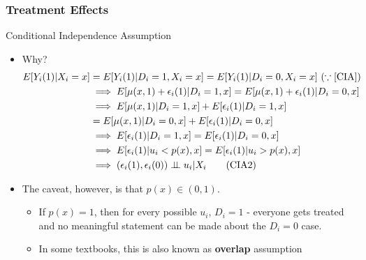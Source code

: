 \documentclass{beamer}
\begin{document}
\begin{frame}
\frametitle{Treatment Effects}
Conditional Independence Assumption
\begin{itemize}
\item Why?
\footnotesize{\begin{align*}
E[Y_i(1)|X_i=x]&=E[Y_i(1)|D_i=1,X_i=x]=E[Y_i(1)|D_i=0,X_i=x] \ (\because \ref{CIA})\\
&\implies E[\mu(x,1)+\epsilon_i(1)|D_i=1,x]=E[\mu(x,1)+\epsilon_i(1)|D_i=0,x]\\
&\implies E[\mu(x,1)|D_i=1,x]+E[\epsilon_i(1)|D_i=1,x]\\
&=E[\mu(x,1)|D_i=0,x]+E[\epsilon_i(1)|D_i=0,x]\\
&\implies E[\epsilon_i(1)|D_i=1,x]=E[\epsilon_i(1)|D_i=0,x]\\
&\implies E[\epsilon_i(1)|u_i<p(x),x]=E[\epsilon_i(1)|u_i>p(x),x]\\
&\implies (\epsilon_i(1), \epsilon_i(0))\perp \!\!\! \perp u_i|X_i \tag{\text{CIA2}}\label{CIA2}
\end{align*}}\normalsize
\item The caveat, however, is that $p(x)\in(0,1)$. 
\begin{itemize}
\item If $p(x)=1$, then for every possible $u_i$, $D_i=1$ - everyone gets treated and no meaningful statement can be made about the $D_i=0$ case. 
\item In some textbooks, this is also known as \textbf{overlap} assumption
\end{itemize}
\end{itemize}
\end{frame}
\end{document}
